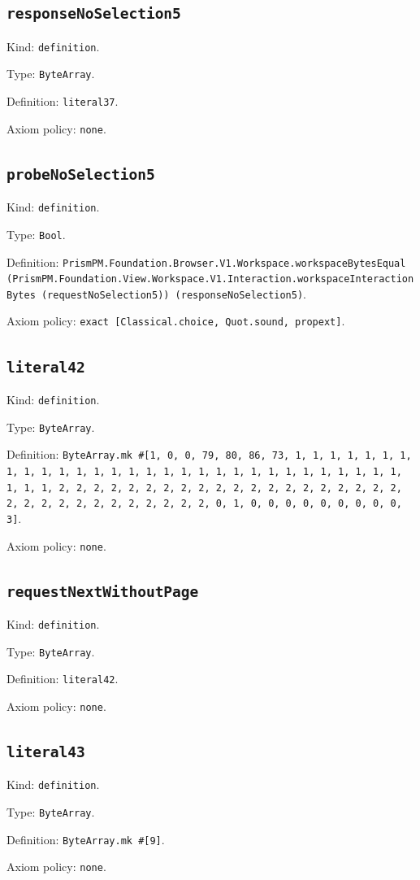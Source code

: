 \documentclass[11pt]{article}
\begin{document}
\subsection*{\texttt{responseNoSelection5}}
\noindent Kind: \texttt{definition}.\par
\noindent Type: \texttt{ByteArray}.\par
\noindent Definition: \texttt{literal37}.\par
\noindent Axiom policy: \texttt{none}.\par
\subsection*{\texttt{probeNoSelection5}}
\noindent Kind: \texttt{definition}.\par
\noindent Type: \texttt{Bool}.\par
\noindent Definition: \texttt{PrismPM.Foundation.Browser.V1.Workspace.workspaceBytesEqual (PrismPM.Foundation.View.Workspace.V1.Interaction.workspaceInteractionBytes (requestNoSelection5)) (responseNoSelection5)}.\par
\noindent Axiom policy: \texttt{exact [Classical.choice, Quot.sound, propext]}.\par
\subsection*{\texttt{literal42}}
\noindent Kind: \texttt{definition}.\par
\noindent Type: \texttt{ByteArray}.\par
\noindent Definition: \texttt{ByteArray.mk \#[1, 0, 0, 79, 80, 86, 73, 1, 1, 1, 1, 1, 1, 1, 1, 1, 1, 1, 1, 1, 1, 1, 1, 1, 1, 1, 1, 1, 1, 1, 1, 1, 1, 1, 1, 1, 1, 1, 1, 1, 2, 2, 2, 2, 2, 2, 2, 2, 2, 2, 2, 2, 2, 2, 2, 2, 2, 2, 2, 2, 2, 2, 2, 2, 2, 2, 2, 2, 2, 2, 2, 2, 0, 1, 0, 0, 0, 0, 0, 0, 0, 0, 0, 3]}.\par
\noindent Axiom policy: \texttt{none}.\par
\subsection*{\texttt{requestNextWithoutPage}}
\noindent Kind: \texttt{definition}.\par
\noindent Type: \texttt{ByteArray}.\par
\noindent Definition: \texttt{literal42}.\par
\noindent Axiom policy: \texttt{none}.\par
\subsection*{\texttt{literal43}}
\noindent Kind: \texttt{definition}.\par
\noindent Type: \texttt{ByteArray}.\par
\noindent Definition: \texttt{ByteArray.mk \#[9]}.\par
\noindent Axiom policy: \texttt{none}.\par
\end{document}

